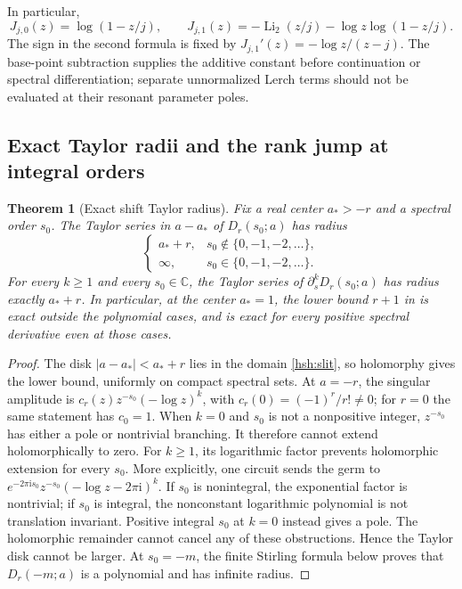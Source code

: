 \documentclass[11pt,a4paper]{article}
\numberwithin{equation}{section}
\newtheorem{theorem}{Theorem}[section]
\theoremstyle{definition}
\theoremstyle{remark}
\begin{document}
In particular,
\[
 J_{j,0}(z)=\log(1-z/j),\qquad
 J_{j,1}(z)=-\operatorname{Li}_2(z/j)
                        -\log z\log(1-z/j).
\]
The sign in the second formula is fixed by
$J_{j,1}'(z)=-\log z/(z-j)$.  The base-point subtraction supplies
the additive constant before continuation or spectral differentiation;
separate unnormalized Lerch terms should not be evaluated at their
resonant parameter poles.

\subsection{Exact Taylor radii and the rank jump at integral orders}

\begin{theorem}[Exact shift Taylor radius]\label{hsh:radius}
Fix a real center $a_*>-r$ and a spectral order $s_0$.
The Taylor series in $a-a_*$ of $D_r(s_0;a)$ has radius
\[
 \begin{cases}
 a_*+r,&s_0\notin\{0,-1,-2,\ldots\},\\
 \infty,&s_0\in\{0,-1,-2,\ldots\}.
 \end{cases}
\]
For every $k\geq1$ and every $s_0\in\mathbb C$, the Taylor
series of $\partial_s^kD_r(s_0;a)$ has radius exactly $a_*+r$.
In particular, at the center $a_*=1$, the lower bound $r+1$
in \cite{RepoMixed} is exact outside the polynomial cases, and is
exact for every positive spectral derivative even at those cases.
\end{theorem}

\begin{proof}
The disk $|a-a_*|<a_*+r$ lies in the domain
\eqref{hsh:slit}, so holomorphy gives the lower bound, uniformly
on compact spectral sets.  At $a=-r$, the singular amplitude is
$c_r(z)z^{-s_0}(-\log z)^k$, with $c_r(0)=(-1)^r/r!\ne0$;
for $r=0$ the same statement has $c_0=1$.
When $k=0$ and $s_0$ is not a nonpositive integer, $z^{-s_0}$
has either a pole or nontrivial branching.  It therefore cannot
extend holomorphically to zero.  For $k\geq1$, its logarithmic
factor prevents holomorphic extension for every $s_0$.  More
explicitly, one circuit sends the germ to
$e^{-2\pi\mathrm i s_0}z^{-s_0}(-\log z-2\pi\mathrm i)^k$.
If $s_0$ is nonintegral, the exponential factor is nontrivial;
if $s_0$ is integral, the nonconstant logarithmic polynomial is
not translation invariant.  Positive integral $s_0$ at $k=0$
instead gives a pole.  The holomorphic remainder cannot cancel
any of these obstructions.  Hence the Taylor disk cannot be
larger.  At $s_0=-m$, the finite Stirling formula below proves
that $D_r(-m;a)$ is a polynomial and has infinite radius.
\end{proof}
\end{document}
